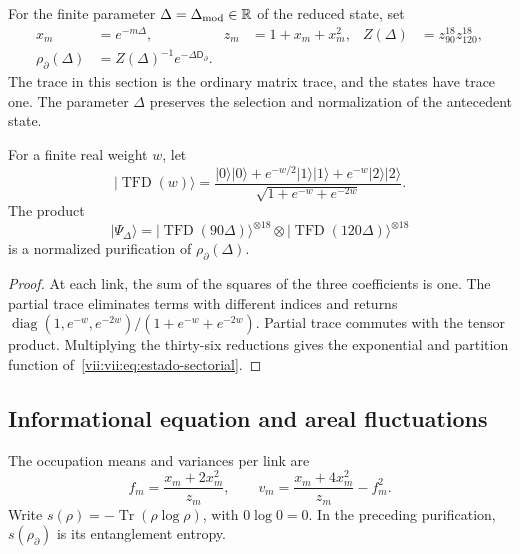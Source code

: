 For the finite parameter \(\Delta=\Delta_{\rm mod}\in\mathbb R\) of the
reduced state, set
\begin{align}
 x_m&=e^{-m\Delta},& z_m&=1+x_m+x_m^2,&
 Z(\Delta)&=z_{90}^{18}z_{120}^{18},\\
 \rho_\partial(\Delta)&=Z(\Delta)^{-1}e^{-\Delta\mathsf D_\partial}.
 \label{vii:vii:eq:estado-sectorial}
\end{align}
The trace in this section is the ordinary matrix trace, and the states
have trace one. The parameter \(\Delta\) preserves the selection and
normalization of the antecedent state.

\begin{proposition}
\label{vii:vii:prop:purificacion-sectorial}
For a finite real weight \(w\), let
\begin{equation}
 |\operatorname{TFD}(w)\rangle
 =\frac{|0\rangle|0\rangle+e^{-w/2}|1\rangle|1\rangle
                   +e^{-w}|2\rangle|2\rangle}
        {\sqrt{1+e^{-w}+e^{-2w}}}.
 \label{vii:vii:eq:tfd-local}
\end{equation}
The product
\begin{equation}
 |\Psi_\Delta\rangle
 =|\operatorname{TFD}(90\Delta)\rangle^{\otimes18}
  \otimes|\operatorname{TFD}(120\Delta)\rangle^{\otimes18}
 \label{vii:vii:eq:tfd-sectorial}
\end{equation}
is a normalized purification of \(\rho_\partial(\Delta)\).
\end{proposition}
\begin{proof}
At each link, the sum of the squares of the three coefficients is one.
The partial trace eliminates terms with different indices and returns
\(\operatorname{diag}(1,e^{-w},e^{-2w})/(1+e^{-w}+e^{-2w})\).
Partial trace commutes with the tensor product. Multiplying the
thirty-six reductions gives the exponential and partition function
of~\eqref{vii:vii:eq:estado-sectorial}.
\end{proof}

\subsection{Informational equation and areal fluctuations}
\label{vii:vii:subsec:ecuacion-informacional}

The occupation means and variances per link are
\begin{equation}
 f_m=\frac{x_m+2x_m^2}{z_m},\qquad
 v_m=\frac{x_m+4x_m^2}{z_m}-f_m^2.
 \label{vii:vii:eq:momentos-sectoriales}
\end{equation}
Write \(s(\rho)=-\operatorname{Tr}(\rho\log\rho)\), with
\(0\log0=0\). In the preceding purification, \(s(\rho_\partial)\)
is its entanglement entropy.

